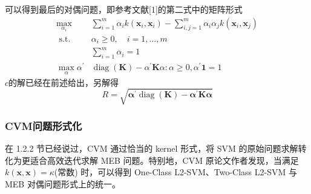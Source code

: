 \documentclass[UTF8, fleqn,10pt]{SelfArx} %
\begin{document}
		可以得到最后的对偶问题，即参考文献[1]的第二式中的矩阵形式
		\begin{equation}
		\begin{aligned} \max _{\alpha_{i}} & \sum_{i=1}^{m} \alpha_{i} k\left(\mathbf{x}_{i}, \mathbf{x}_{i}\right)-\sum_{i, j=1}^{m} \alpha_{i} \alpha_{j} k\left(\mathbf{x}_{i}, \mathbf{x}_{j}\right) \\ \text { s.t. } & \alpha_{i} \geq 0, \quad i=1, \ldots, m \\ & \sum_{i=1}^{m} \alpha_{i}=1 \\ \max _{\alpha} \alpha^{\prime} &\operatorname{diag}(\mathbf{K})-\alpha^{\prime} \mathbf{K} \alpha : \alpha \geq 0, \alpha^{\prime} \textbf{1}=1 \end{aligned}
		\end{equation}
		$c$的解已经在前述给出，另解得$$
		R=\sqrt{\boldsymbol{\alpha}^{\prime} \operatorname{diag}(\mathbf{K})-\boldsymbol{\alpha}^{\prime} \mathbf{K} \boldsymbol{\alpha}}
		$$
		\subsubsection{CVM问题形式化}
		在 1.2.2 节已经说过，CVM 通过恰当的 kernel 形式，将 SVM 的原始问题求解转化为更适合高效迭代求解 MEB 问题。特别地，CVM 原论文作者发现，当满足 $k(\mathbf{x}, \mathbf{x})=\kappa$(常数) 时，可以得到 One-Class L2-SVM、Two-Class L2-SVM 与 MEB 对偶问题形式上的统一。
\end{document}
